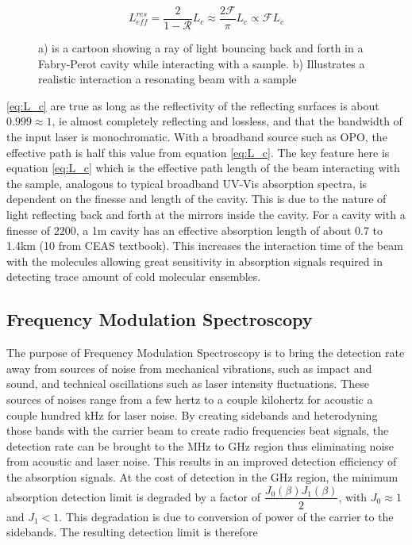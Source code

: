 \documentclass[11pt,a4paper]{book}
\newcommand{\imginput}[1]{} %
\begin{document}
			\begin{equation} \label{eq:L_c}
			L_{eff}^{res}=\dfrac{2}{1-\mathcal{R}} L_c 
			\approx
			\dfrac{2\mathcal{F}}{\pi} L_c
			\propto \mathcal{F}L_c
			\end{equation}		
			
			\begin{figure} [!ht]
				\centering
				\def\svgwidth{\columnwidth}
				\resizebox{150mm}{!}{\imginput{images/CEAS-cartoon.pdf_tex}}
				\label{fig:CEAS}
				\caption{a) is a cartoon showing a ray of light bouncing back and forth in a Fabry-Perot cavity while interacting with a sample. b) Illustrates a realistic interaction a resonating beam with a sample }
			\end{figure}
			
			\noindent
			\autoref{eq:L_c} are true as long as the reflectivity of the reflecting surfaces is about $0.999 \approx 1$, ie almost completely reflecting and lossless, and that the bandwidth of the input laser is monochromatic. With a broadband source such as OPO, the effective path is half this value from equation \autoref{eq:L_c}. 
			The key feature here is equation \autoref{eq:L_c} which is the effective path length of the beam interacting with the sample, analogous to typical broadband UV-Vis absorption spectra, is dependent on the finesse and length of the cavity. 
			This is due to the nature of light reflecting back and forth at the mirrors inside the cavity. For a cavity with a finesse of $2200$, a 1m cavity has an effective absorption length of about 0.7 to 1.4km (10 from CEAS textbook). 
			This increases the interaction time of the beam with the molecules allowing great sensitivity in absorption signals required in detecting trace amount of cold molecular ensembles.
		
		\subsection{Frequency Modulation Spectroscopy}
			\label{ssec:Frequency Modulation Spectroscopy}
			The purpose of Frequency Modulation Spectroscopy is to bring the detection rate away from sources of noise from mechanical vibrations, such as impact and sound, and technical oscillations such as laser intensity fluctuations. These sources of noises range from a few hertz to a couple kilohertz for acoustic a couple hundred kHz for laser noise.  By creating sidebands and heterodyning those bands with the carrier beam to create radio frequencies beat signals, the detection rate can be brought to the MHz to GHz region thus eliminating noise from acoustic and laser noise. This results in an improved detection efficiency of the absorption signals. At the cost of detection in the GHz region, the minimum absorption detection limit is degraded by a factor of $\dfrac{J_0(\beta)J_1(\beta)}{2}$, with $J_0 \approx 1$ and $J_1 < 1 $. This degradation is due to conversion of power of the carrier to the sidebands. The resulting detection limit is therefore
			
\end{document}
